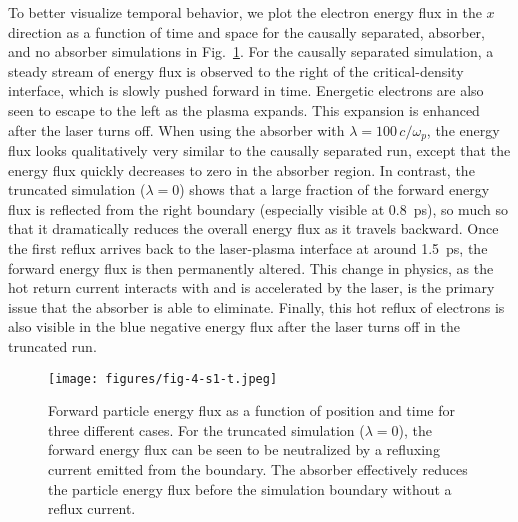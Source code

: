 \documentclass[../absorber.tex]{subfiles}
\begin{document}
To better visualize temporal behavior, we plot the electron energy flux in the $x$ direction as a function of time and space for the causally separated, absorber, and no absorber simulations in Fig.~\ref{fig:s1-t}.  For the causally separated simulation, a steady stream of energy flux is observed to the right of the critical-density interface, which is slowly pushed forward in time.  Energetic electrons are also seen to escape to the left as the plasma expands.  This expansion is enhanced after the laser turns off.  When using the absorber with $\lambda=100\,c/\omega_p$, the energy flux looks qualitatively very similar to the causally separated run, except that the energy flux quickly decreases to zero in the absorber region.  In contrast, the truncated simulation ($\lambda=0$) shows that a large fraction of the forward energy flux is reflected from the right boundary (especially visible at 0.8~ps), so much so that it dramatically reduces the overall energy flux as it travels backward.  Once the first reflux arrives back to the laser-plasma interface at around 1.5~ps, the forward energy flux is then permanently altered.  This change in physics, as the hot return current interacts with and is accelerated by the laser, is the primary issue that the absorber is able to eliminate.  Finally, this hot reflux of electrons is also visible in the blue negative energy flux after the laser turns off in the truncated run.

\begin{figure}[htp]
\texttt{[image: figures/fig-4-s1-t.jpeg]}
\caption{\label{fig:s1-t} Forward particle energy flux as a function of position and time for three different cases.  For the truncated simulation ($\lambda=0$), the forward energy flux can be seen to be neutralized by a refluxing current emitted from the boundary.  The absorber effectively reduces the particle energy flux before the simulation boundary without a reflux current.}
\end{figure}

\end{document}

